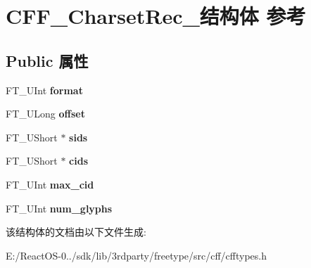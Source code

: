 \hypertarget{struct_c_f_f___charset_rec__}{}\section{C\+F\+F\+\_\+\+Charset\+Rec\+\_\+结构体 参考}
\label{struct_c_f_f___charset_rec__}
\subsection*{Public 属性}
\begin{DoxyCompactItemize}
\item 
\mbox{\label{struct_c_f_f___charset_rec___a5f8d1ab5598564a2ba1a444db320e0d5}} 
F\+T\+\_\+\+U\+Int {\bfseries format}
\item 
\mbox{\label{struct_c_f_f___charset_rec___accf21fc6bd1e7e36b7d4beca041f4a3f}} 
F\+T\+\_\+\+U\+Long {\bfseries offset}
\item 
\mbox{\label{struct_c_f_f___charset_rec___a1a8b95d80a18ebb7b02b2ab3aaa672e7}} 
F\+T\+\_\+\+U\+Short $\ast$ {\bfseries sids}
\item 
\mbox{\label{struct_c_f_f___charset_rec___a54f2abbf89cfe39f8f52593e99936033}} 
F\+T\+\_\+\+U\+Short $\ast$ {\bfseries cids}
\item 
\mbox{\label{struct_c_f_f___charset_rec___ae4fedec603fadfe5386dc611b7dba137}} 
F\+T\+\_\+\+U\+Int {\bfseries max\+\_\+cid}
\item 
\mbox{\label{struct_c_f_f___charset_rec___a41eeac7d0397d81a605279cb39b7fcbc}} 
F\+T\+\_\+\+U\+Int {\bfseries num\+\_\+glyphs}
\end{DoxyCompactItemize}


该结构体的文档由以下文件生成\+:\begin{DoxyCompactItemize}
\item 
E\+:/\+React\+O\+S-\/0../sdk/lib/3rdparty/freetype/src/cff/cfftypes.\+h\end{DoxyCompactItemize}

